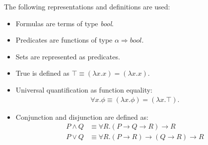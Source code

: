 \documentclass{article}
\begin{document}
\begin{definition}
    The following representations and definitions are used:
    \begin{itemize}
        \item Formulas are terms of type \textit{bool}.
        \item Predicates are functions of type $\alpha\Rightarrow\textit{bool}$.
        \item Sets are represented as predicates.
        \item True is defined as $\top \equiv (\lambda x.x)=(\lambda x.x)$.
        \item Universal quantification as function equality: \begin{align*}
            \forall x. \phi \equiv (\lambda x. \phi) = (\lambda x. \top).
        \end{align*}
        \item Conjunction and disjunction are defined as: \begin{align*}
            P\wedge Q &\equiv \forall R. (P\rightarrow Q \rightarrow R) \rightarrow R\\
            P\vee Q &\equiv \forall R. (P\rightarrow R)\rightarrow (Q\rightarrow R) \rightarrow R
        \end{align*}
    \end{itemize}
\end{definition}
\end{document}

